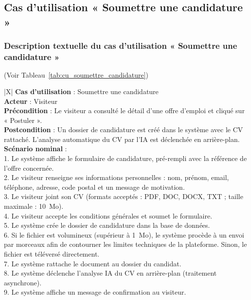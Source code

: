 \subsection{Cas d'utilisation « Soumettre une candidature »}

\subsubsection{Description textuelle du cas d'utilisation « Soumettre une candidature »}
(Voir Tableau~\ref{tab:cu_soumettre_candidature})

\begin{xltabular}{\linewidth}{|X|}
    \hline
    \textbf{Cas d'utilisation} : Soumettre une candidature \\
    \hline
    \textbf{Acteur} : Visiteur \\
    \hline
    \textbf{Précondition} : Le visiteur a consulté le détail d'une offre d'emploi et cliqué sur « Postuler ». \\
    \hline
    \textbf{Postcondition} : Un dossier de candidature est créé dans le système avec le CV rattaché. L'analyse automatique du CV par l'IA est déclenchée en arrière-plan. \\
    \hline
    \textbf{Scénario nominal} : \\
    1. Le système affiche le formulaire de candidature, pré-rempli avec la référence de l'offre concernée. \\
    2. Le visiteur renseigne ses informations personnelles : nom, prénom, email, téléphone, adresse, code postal et un message de motivation. \\
    3. Le visiteur joint son CV (formats acceptés : PDF, DOC, DOCX, TXT ; taille maximale : 10~Mo). \\
    4. Le visiteur accepte les conditions générales et soumet le formulaire. \\
    5. Le système crée le dossier de candidature dans la base de données. \\
    6. Si le fichier est volumineux (supérieur à 1~Mo), le système procède à un envoi par morceaux afin de contourner les limites techniques de la plateforme. Sinon, le fichier est téléversé directement. \\
    7. Le système rattache le document au dossier du candidat. \\
    8. Le système déclenche l'analyse IA du CV en arrière-plan (traitement asynchrone). \\
    9. Le système affiche un message de confirmation au visiteur. \\

\end{xltabular}
